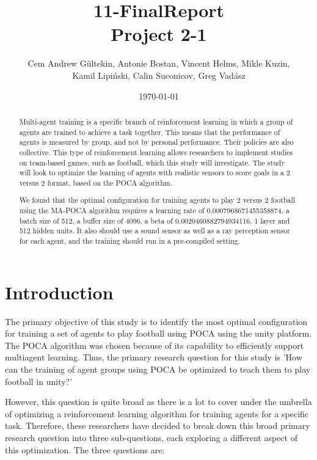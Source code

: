 \documentclass{LSkill}
\begin{document}
\title{11-FinalReport \\ \large{Project 2-1}}
\author{Cem Andrew Gültekin, Antonie Bostan, Vincent Helms, Mikle Kuzin, \\ 
    Kamil Lipiński, Calin Suconicov, Greg Vadász}
\date{\today}

\maketitle

\tableofcontents    %


\begin{abstract}
Multi-agent training is a specific branch of reinforcement learning in which a group of agents are trained to achieve a task together. This means that the performance of agents is measured by group, and not by personal performance. Their policies are also collective. This type of reinforcement learning allows researchers to implement studies on team-based games, such as football, which this study will investigate. The study will look to optimize the learning of agents with realistic sensors to score goals in a 2 versus 2 format, based on the POCA algorithm. 

We found that the optimal configuration for training agents to play 2 versus 2 football using the MA-POCA algorithm requires a learning rate of 0.0007968671455358874, a batch size of 512, a buffer size of 4096, a beta of 0.0020460882794934116, 1 layer and 512 hidden units. It also should use a sound sensor as well as a ray perception sensor for each agent, and the training should run in a pre-compiled setting. \end{abstract}

\section{Introduction}
\label{sec:intro}
The primary objective of this study is to identify the most optimal configuration for training a set of agents to play football using POCA using the unity platform. The POCA algorithm was chosen because of its capability to efficiently support multiagent learning. Thus, the primary research question for this study is 'How can the training of agent groups using POCA be optimized to teach them to play football in unity?'

However, this question is quite broad as there is a lot to cover under the umbrella of optimizing a reinforcement learning algorithm for training agents for a specific task. Therefore, these researchers have decided to break down this broad primary research question into three sub-questions, each exploring a different aspect of this optimization. The three questions are:
\end{document}
